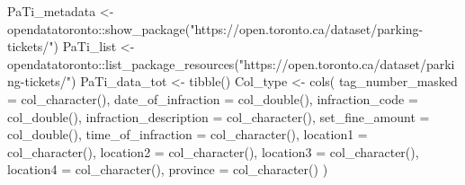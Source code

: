 \documentclass[
]{article}
\newenvironment{Shaded}{\begin{snugshade}}{\end{snugshade}}
\newcommand{\AttributeTok}[1]{\textcolor[rgb]{0.77,0.63,0.00}{#1}}
\newcommand{\FunctionTok}[1]{\textcolor[rgb]{0.00,0.00,0.00}{#1}}
\newcommand{\NormalTok}[1]{#1}
\newcommand{\OtherTok}[1]{\textcolor[rgb]{0.56,0.35,0.01}{#1}}
\newcommand{\SpecialCharTok}[1]{\textcolor[rgb]{0.00,0.00,0.00}{#1}}
\newcommand{\StringTok}[1]{\textcolor[rgb]{0.31,0.60,0.02}{#1}}
\begin{document}
\begin{Shaded}
\begin{Highlighting}[]
\NormalTok{PaTi\_metadata }\OtherTok{\textless{}{-}}\NormalTok{ opendatatoronto}\SpecialCharTok{::}\FunctionTok{show\_package}\NormalTok{(}\StringTok{"https://open.toronto.ca/dataset/parking{-}tickets/"}\NormalTok{)}
\NormalTok{PaTi\_list }\OtherTok{\textless{}{-}}\NormalTok{ opendatatoronto}\SpecialCharTok{::}\FunctionTok{list\_package\_resources}\NormalTok{(}\StringTok{"https://open.toronto.ca/dataset/parking{-}tickets/"}\NormalTok{)}
\NormalTok{PaTi\_data\_tot }\OtherTok{\textless{}{-}} \FunctionTok{tibble}\NormalTok{()}
\NormalTok{Col\_type }\OtherTok{\textless{}{-}} \FunctionTok{cols}\NormalTok{(}
        \AttributeTok{tag\_number\_masked =} \FunctionTok{col\_character}\NormalTok{(),}
        \AttributeTok{date\_of\_infraction =} \FunctionTok{col\_double}\NormalTok{(),}
        \AttributeTok{infraction\_code =} \FunctionTok{col\_double}\NormalTok{(),}
        \AttributeTok{infraction\_description =} \FunctionTok{col\_character}\NormalTok{(),}
        \AttributeTok{set\_fine\_amount =} \FunctionTok{col\_double}\NormalTok{(),}
        \AttributeTok{time\_of\_infraction =} \FunctionTok{col\_character}\NormalTok{(),}
        \AttributeTok{location1 =} \FunctionTok{col\_character}\NormalTok{(),}
        \AttributeTok{location2 =} \FunctionTok{col\_character}\NormalTok{(),}
        \AttributeTok{location3 =} \FunctionTok{col\_character}\NormalTok{(),}
        \AttributeTok{location4 =} \FunctionTok{col\_character}\NormalTok{(),}
        \AttributeTok{province =} \FunctionTok{col\_character}\NormalTok{()}
\NormalTok{      )}


\end{Highlighting}
\end{Shaded}
\end{document}
